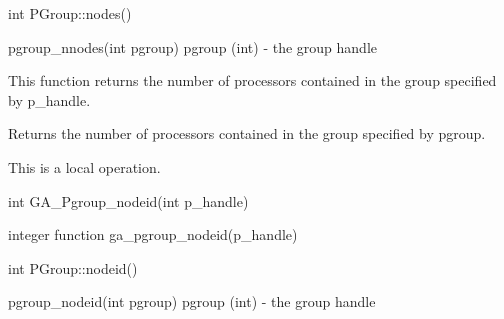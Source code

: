 \documentclass[12pt]{article}
\begin{document}
\begin{cxxapi}
\begin{cxxcode}
int PGroup::nodes()
\end{cxxcode}
\end{cxxapi}

\begin{pyapi}
\begin{pycode}
pgroup_nnodes(int pgroup) 
   pgroup (int)                  - the group handle 
\end{pycode}
\end{pyapi}


\begin{desc}

This function returns the number of processors contained in the group specified by p_handle.

Returns the number of processors contained in the group specified by 
pgroup.

This is a local operation.
\end{desc}


\begin{capi}
\begin{ccode}
int GA_Pgroup_nodeid(int p_handle)
\end{ccode}
\begin{funcargs}
\end{funcargs}
\end{capi}

\begin{fapi}
\begin{fcode}
integer function ga_pgroup_nodeid(p_handle)
\end{fcode}
\begin{funcargs}
\end{funcargs}
\end{fapi}

\begin{cxxapi}
\begin{cxxcode}
int PGroup::nodeid()
\end{cxxcode}
\end{cxxapi}

\begin{pyapi}
\begin{pycode}
pgroup_nodeid(int pgroup) 
   pgroup (int)                  - the group handle
\end{pycode}
\end{pyapi}
\end{document}
